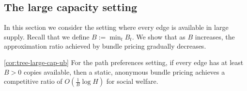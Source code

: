 \subsection{The large capacity setting}
\label{sec:trees-large-cap-ub}

In this section we consider the setting where every edge is available in large
supply. Recall that we define $B:= \min_t B_t$. 
We show that as $B$ increases, the
approximation ratio achieved by bundle pricing gradually decreases. 

\begin{numberedtheorem}{\ref{cor:tree-large-cap-ub}}
For the path preferences setting, if every edge has at least $B>0$
copies available, then a static, anonymous bundle pricing achieves a
competitive ratio of
\(
    O\left(\frac1B\log H\right)
\)
for social welfare.
\end{numberedtheorem}


